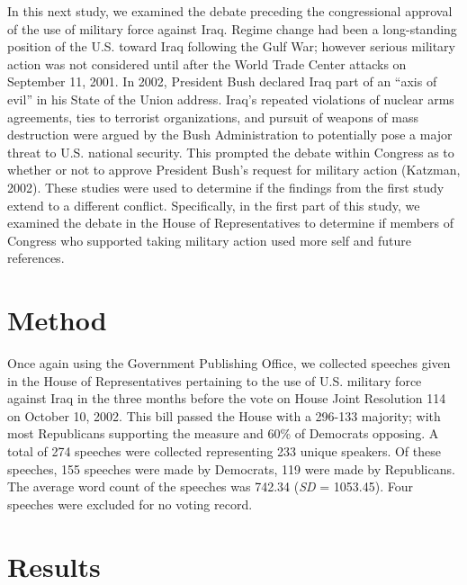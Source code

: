\documentclass[english,,man]{apa6}
\begin{document}
In this next study, we examined the debate preceding the congressional approval of the use of military force against Iraq. Regime change had been a long-standing position of the U.S. toward Iraq following the Gulf War; however serious military action was not considered until after the World Trade Center attacks on September 11, 2001. In 2002, President Bush declared Iraq part of an \enquote{axis of evil} in his State of the Union address. Iraq's repeated violations of nuclear arms agreements, ties to terrorist organizations, and pursuit of weapons of mass destruction were argued by the Bush Administration to potentially pose a major threat to U.S. national security. This prompted the debate within Congress as to whether or not to approve President Bush's request for military action (Katzman, 2002). These studies were used to determine if the findings from the first study extend to a different conflict. Specifically, in the first part of this study, we examined the debate in the House of Representatives to determine if members of Congress who supported taking military action used more self and future references.

\hypertarget{method-3}{%
\section{Method}\label{method-3}}

Once again using the Government Publishing Office, we collected speeches given in the House of Representatives pertaining to the use of U.S. military force against Iraq in the three months before the vote on House Joint Resolution 114 on October 10, 2002. This bill passed the House with a 296-133 majority; with most Republicans supporting the measure and 60\% of Democrats opposing. A total of 274 speeches were collected representing 233 unique speakers. Of these speeches, 155 speeches were made by Democrats, 119 were made by Republicans. The average word count of the speeches was 742.34 (\emph{SD} = 1053.45). Four speeches were excluded for no voting record.

\hypertarget{results-2}{%
\section{Results}\label{results-2}}
\end{document}
